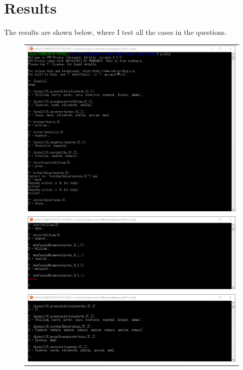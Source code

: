 ﻿\documentclass[a4paper, 11pt]{article}
\begin{document}
\section{Results}
The results are shown below, where I test all the cases in the questions.
\begin{figure}[H]
\centering
\begin{tabular}{c}
\includegraphics[width=\linewidth]{fig/result.png}\\
\includegraphics[width=\linewidth]{fig/result2.png}\\
\includegraphics[width=\linewidth]{fig/result3.png}
\end{tabular}
\end{figure}

%
%
\end{document}
